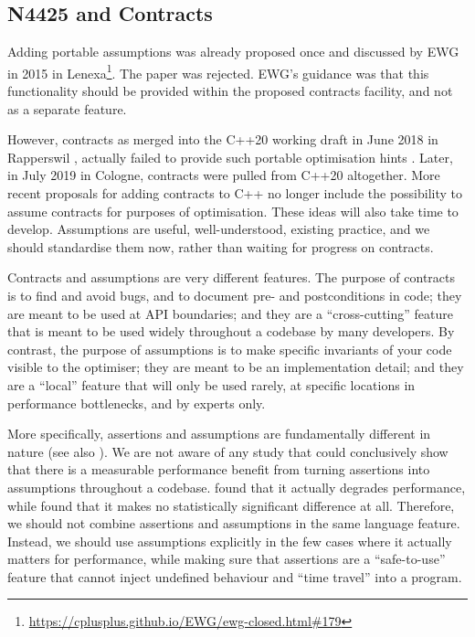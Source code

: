 \subsection{N4425 and Contracts}
\label{sec:contracts}

Adding portable assumptions was already proposed once \cite{N4425} and discussed by EWG in 2015 in Lenexa\footnote{\url{https://cplusplus.github.io/EWG/ewg-closed.html\#179}}. The paper was rejected. EWG's guidance was that this functionality should be provided within the proposed contracts facility, and not as a separate feature.

However, contracts as merged into the C++20 working draft in June 2018 in Rapperswil \cite{P0542R5}, actually failed to provide such portable optimisation hints \cite{P1773R0}. Later, in July 2019 in Cologne, contracts were pulled from C++20 altogether. More recent proposals \cite{P2358R0} for adding contracts to C++ no longer include the possibility to assume contracts for purposes of optimisation. These ideas will also take time to develop. Assumptions are useful, well-understood, existing practice, and we should standardise them now, rather than waiting for progress on contracts.

Contracts and assumptions are very different features. The purpose of contracts is to find and avoid bugs, and to document pre- and postconditions in code; they are meant to be used at API boundaries; and they are a ``cross-cutting'' feature that is meant to be used widely throughout a codebase by many developers. By contrast, the purpose of assumptions is to make specific invariants of your code visible to the optimiser; they are meant to be an implementation detail; and they are a ``local'' feature that will only be used rarely, at specific locations in performance bottlenecks, and by experts only.

More specifically, assertions and assumptions are fundamentally different in nature (see also \cite{P2064R0}). We are not aware of any study that could conclusively show that there is a measurable performance benefit from turning assertions into assumptions throughout a codebase. \cite{P2064R0} found that it actually degrades performance, while \cite{Amini2021} found that it makes no statistically significant difference at all. Therefore, we should not combine assertions and assumptions in the same language feature. Instead, we should use assumptions explicitly in the few cases where it actually matters for performance, while making sure that assertions are a ``safe-to-use'' feature that cannot inject undefined behaviour and ``time travel'' into a program.

